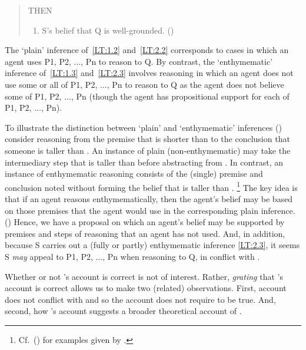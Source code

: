 \begin{note}
\begin{quote}
    THEN
    \begin{enumerate}[label=(3)]
    \item S's belief that Q is well-grounded.\nolinebreak
      \mbox{}\hfill\mbox{(\citeyear[87]{Moretti:2019wx})}
    \end{enumerate}
  \end{quote}

  The `plain' inference of~\ref{LT:1.2} and~\ref{LT:2.2} corresponds to cases in which an agent uses P1, P2, \(\dots\), Pn to reason to Q.
  By contrast, the `enthymematic' inference of~\ref{LT:1.3} and~\ref{LT:2.3} involves reasoning in which an agent does not use some or all of P1, P2, \(\dots\), Pn to reason to Q as the agent does not believe some of P1, P2, \(\dots\), Pn (though the agent has propositional support for each of P1, P2, \(\dots\), Pn).

  To illustrate the distinction between `plain' and `enthymematic' inferences (\citeyear[Cf.][85]{Moretti:2019wx}) consider reasoning from the premise that  is shorter than  to the conclusion that someone is taller than .
  An instance of plain (non-enthymematic) may take the intermediary step that  is taller than  before abstracting from .
  In contrast, an instance of enthymematic reasoning consists of the (single) premise and conclusion noted without forming the belief that  is taller than .\nolinebreak
  \footnote{Cf.\ (\citeyear[87--89]{Moretti:2019wx}) for examples given by \citeauthor{Moretti:2019wx}.}
  The key idea is that if an agent reasons enthymematically, then the agent's belief may be based on those premises that the agent would use in the corresponding plain inference.
  (\citeyear[Cf.][86--87]{Moretti:2019wx})
  Hence, we have a proposal on which an agent's belief may be supported by premises and steps of reasoning that an agent has not used.
  And, in addition, because S carries out a (fully or partly) enthymematic inference \ref{LT:2.3}, it seems S \emph{may} appeal to P1, P2, \(\dots\), Pn when reasoning to Q, in conflict with \ESU{}.

  Whether or not \citeauthor{Moretti:2019wx}'s account is correct is not of interest.
  Rather, \emph{grating} that \citeauthor{Moretti:2019wx}'s account is correct allows us to make two (related) observations.
  First, \citeauthor{Moretti:2019wx} account does not conflict with \ESU{} and so the account does not require \EAS{} to be true.
  And, second, how \citeauthor{Moretti:2019wx}'s account suggests a broader theoretical account of \EAS{}.
\end{note}

